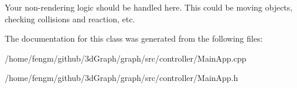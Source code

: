 Your non-\/rendering logic should be handled here. This could be moving objects, checking collisions and reaction, etc. 

The documentation for this class was generated from the following files\+:\begin{DoxyCompactItemize}
\item 
/home/fengm/github/3d\+Graph/graph/src/controller/Main\+App.\+cpp\item 
/home/fengm/github/3d\+Graph/graph/src/controller/Main\+App.\+h\end{DoxyCompactItemize}
